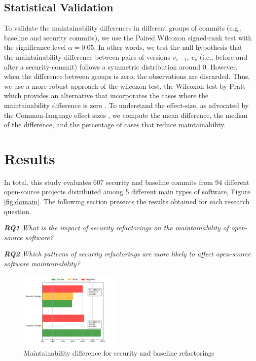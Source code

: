 \documentclass[10pt,conference]{IEEEtran}
\begin{document}
\subsection{Statistical Validation}\label{sec:statsval}

To validate the maintainability differences in different groups of commits (e.g., baseline and security commits), we use the Paired Wilcoxon signed-rank test \cite{10.2307/3001968} with the significance level $\alpha = 0.05$. In other words, we test the null hypothesis that the maintainability difference between pairs of versions $v_{v-1}$, $v_v$ (i.e., before and after a security-commit) follows a symmetric distribution around $0$. However, when the difference between groups is zero, the observations are discarded. Thus, we use a more robust approach of the wilcoxon test, the Wilcoxon test by Pratt which provides an alternative that incorporates the cases where the maintainability difference is zero \cite{10.2307/2282543}. To understand the effect-size, as advocated by the Common-language effect sizes \cite{graw:1992}, we compute the mean difference, the median of the difference, and the percentage of cases that reduce maintainability. 

\section{Results}\label{sec:results}

In total, this study evaluates $607$ security and baseline commits from 94 different open-source projects distributed among 5 different main types of software, Figure \ref{fig:domain}. The following section presents the results obtained for each research question.

\begin{framed}
\textit{\textbf{RQ1} What is the impact of security refactorings on the maintainability of open-source software?}
\end{framed}


\begin{framed}
\textit{\textbf{RQ2} Which patterns of security refactorings are more likely to affect open-source software maintainability?}
\end{framed}


\begin{figure}[h]
 	\centering
 	\includegraphics[width=0.45\textwidth]{figures/maintainability.pdf}
 	\caption{Maintainability difference for security and baseline refactorings}
	\label{fig:secvsreg}
\end{figure}
\end{document}
